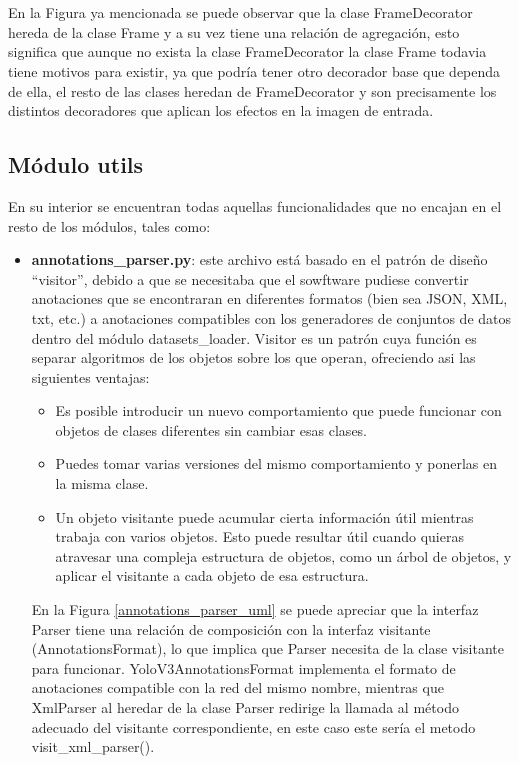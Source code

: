 \\
\\
En la Figura ya mencionada se puede observar que la clase FrameDecorator hereda de la clase Frame y a su vez tiene una relación de agregación, esto significa que aunque no exista la clase FrameDecorator la clase Frame todavia tiene motivos para existir, ya que podría tener otro decorador base que dependa de ella, el resto de las clases heredan de FrameDecorator y son precisamente los distintos decoradores que aplican los efectos en la imagen de entrada.
\subsection{Módulo utils}
En su interior se encuentran todas aquellas funcionalidades que no encajan en el resto de los módulos, tales como:
\begin{itemize}
    \item \textbf{annotations\_parser.py}: este archivo está basado en el patrón de diseño ``visitor'', debido a que se necesitaba que el sowftware pudiese convertir anotaciones que se encontraran en diferentes formatos (bien sea JSON, XML, txt, etc.) a anotaciones compatibles con los generadores de conjuntos de datos dentro del módulo datasets\_loader. Visitor es un patrón cuya función es separar algoritmos de los objetos sobre los que operan, ofreciendo asi las siguientes ventajas:
    \begin{itemize}
        \item Es posible introducir un nuevo comportamiento que puede funcionar con objetos de clases diferentes sin cambiar esas clases.
        \item Puedes tomar varias versiones del mismo comportamiento y ponerlas en la misma clase.
        \item Un objeto visitante puede acumular cierta información útil mientras trabaja con varios objetos. Esto puede resultar útil cuando quieras atravesar una compleja estructura de objetos, como un árbol de objetos, y aplicar el visitante a cada objeto de esa estructura.
    \end{itemize}
    En la Figura \ref{annotations_parser_uml} se puede apreciar que la interfaz Parser tiene una relación de composición con la interfaz visitante (AnnotationsFormat), lo que implica que Parser necesita de la clase visitante para funcionar. YoloV3AnnotationsFormat implementa el formato de anotaciones compatible con la red del mismo nombre, mientras que XmlParser al heredar de la clase Parser redirige la llamada al método adecuado del visitante correspondiente, en este caso este sería el metodo visit\_xml\_parser(). 

\end{itemize}
